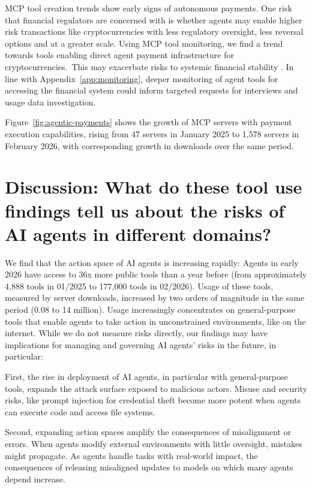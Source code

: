 \documentclass[manuscript,screen,nonacm,oneside]{acmart}
\begin{document}
MCP tool creation trends show early signs of autonomous payments. One risk that financial regulators are concerned with is whether agents may enable higher risk transactions like cryptocurrencies with less regulatory oversight, less reversal options and at a greater scale. Using MCP tool monitoring, we find a trend towards tools enabling direct agent payment infrastructure for cryptocurrencies.~This may exacerbate risks to systemic financial stability \citep{von2024crypto}. In line with Appendix~\ref{app:monitoring}, deeper monitoring of agent tools for accessing the financial system could inform targeted requests for interviews and usage data investigation.

Figure~\ref{fig:agentic-payments} shows the growth of MCP servers with payment execution capabilities, rising from 47 servers in January 2025 to 1,578 servers in February 2026, with corresponding growth in downloads over the same period.

\section{Discussion: What do these tool use findings tell us about the risks of AI agents in different domains?}
\label{sec:discussion}
We find that the action space of AI agents is increasing rapidly: Agents in early 2026 have access to 36x more public tools than a year before (from approximately 4,888 tools in 01/2025 to 177,000 tools in 02/2026). Usage of these tools, measured by server downloads, increased by two orders of magnitude in the same period (0.08 to 14 million). Usage increasingly concentrates on general-purpose tools that enable agents to take action in unconstrained environments, like on the internet. While we do not measure risks directly, our findings may have implications for managing and governing AI agents' risks in the future, in particular: 

First, the rise in deployment of AI agents, in particular with general-purpose tools, expands the attack surface exposed to malicious actors. Misuse and security risks, like prompt injection for credential theft become more potent when agents can execute code and access file systems.

Second, expanding action spaces amplify the consequences of misalignment or errors. When agents modify external environments with little oversight, mistakes might propagate. As agents handle tasks with real-world impact, the consequences of releasing misaligned updates to models on which many agents depend increase. 
\end{document}
